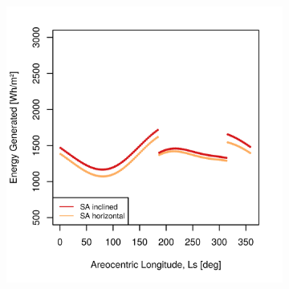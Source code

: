 \begin{figure}[h]
\captionsetup[subfigure]{justification=centering}
\vspace{-2ex}
	\centering
    \setlength{\subfigureWidth}{0.50\textwidth}
    \setlength{\graphicsHeight}{80mm}
    \hypersetup{hidelinks=true}%
    \begin{subfigure}[t]{\subfigureWidth}
        \centering
        \includegraphics[height=\graphicsHeight]{sections/design/solar-array/plots/ianichaos-daily-generated-energy.png}
        \label{fig:plot:sub:iani-chaos-generated-energy}
    \end{subfigure}\hfill
    \begin{subfigure}[t]{\subfigureWidth}
        \centering

\end{subfigure}
\end{figure}
